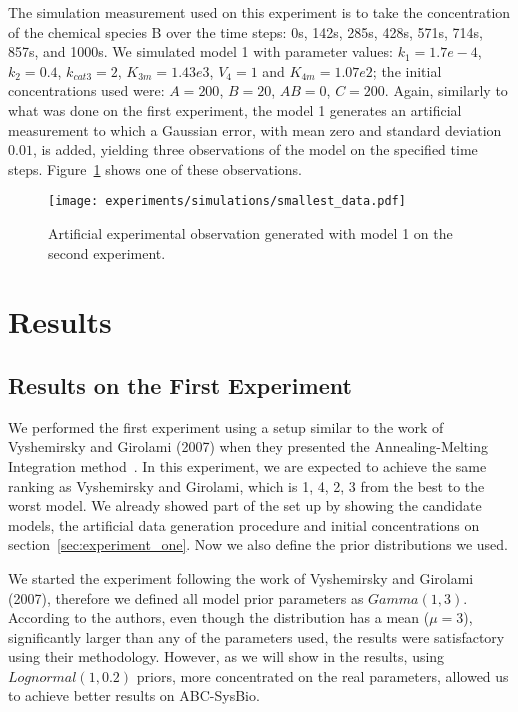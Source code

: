The simulation measurement used on this experiment is to take the 
concentration of the chemical species B over the time steps: 0s, 142s,
285s, 428s, 571s, 714s, 857s, and 1000s. We simulated model 1 with 
parameter values: $k_1 = 1.7e-4$, $k_2 = 0.4$, $k_{cat3} = 2$, 
$K_{3m} = 1.43e3$, $V_4 = 1$ and $K_{4m} = 1.07e2$; the initial 
concentrations used were: $A = 200$, $B = 20$, $AB = 0$, $C = 200$.
Again, similarly to what was done on the first experiment, the model 1
generates an artificial measurement to which a Gaussian error, with 
mean zero and standard deviation $0.01$, is added, yielding three 
observations of the model on the specified time steps. 
Figure~\ref{fig:sma_simulation} shows one of these observations.


\begin{figure}
    \begin{center}
    \texttt{[image: experiments/simulations/smallest\_data.pdf]}
    \caption{Artificial experimental observation generated with model 1 
        on the second experiment.}
    \label{fig:sma_simulation}
    \end{center}
\end{figure}


\section{Results}

\subsection{Results on the First Experiment}
We performed the first experiment using a setup similar to the work of
Vyshemirsky and Girolami (2007) when they presented the 
Annealing-Melting Integration method~\cite{Vyshemirsky2007}. 
In this experiment, we are expected to achieve the same ranking as 
Vyshemirsky and Girolami, which is 1, 4, 2, 3 from the best to the worst 
model. We already showed part of the set up by showing the candidate 
models, the artificial data generation procedure and initial 
concentrations on section~\ref{sec:experiment_one}. Now we also define 
the prior distributions we used. 

We started the experiment following the work of Vyshemirsky and Girolami
(2007), therefore we defined all model prior parameters as 
$Gamma (1, 3)$. According to the authors, even though the distribution 
has a mean ($\mu = 3$), significantly larger than any of the parameters
used, the results were satisfactory using their methodology. However,
as we will show in the results, using $Lognormal (1, 0.2)$ priors, more 
concentrated on the real parameters, allowed us to achieve better 
results on ABC-SysBio. 



